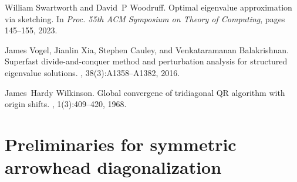 \documentclass{article}
\begin{document}
\begin{thebibliography}{10}
William Swartworth and David~P Woodruff.
\newblock Optimal eigenvalue approximation via sketching.
\newblock In {\em Proc. 55th ACM Symposium on Theory of Computing}, pages 145--155, 2023.

James Vogel, Jianlin Xia, Stephen Cauley, and Venkataramanan Balakrishnan.
\newblock Superfast divide-and-conquer method and perturbation analysis for structured eigenvalue solutions.
, 38(3):A1358--A1382, 2016.

James~Hardy Wilkinson.
\newblock Global convergene of tridiagonal {QR} algorithm with origin shifts.
, 1(3):409--420, 1968.

\end{thebibliography}

\newpage

\appendix


\section{Preliminaries for symmetric arrowhead diagonalization}
\label{section:arrowhead_preliminaries}
\end{document}
